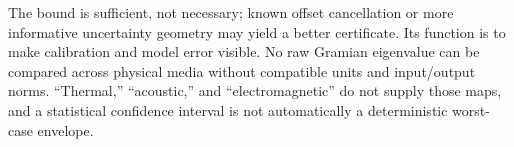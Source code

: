 The bound is sufficient, not necessary; known offset cancellation or more informative uncertainty geometry may yield a better certificate. Its function is to make calibration and model error visible. No raw Gramian eigenvalue can be compared across physical media without compatible units and input/output norms. ``Thermal,'' ``acoustic,'' and ``electromagnetic'' do not supply those maps, and a statistical confidence interval is not automatically a deterministic worst-case envelope.
